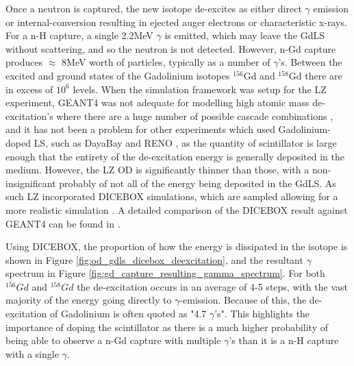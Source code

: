 \par
Once a neutron is captured, the new isotope de-excites as either direct $\gamma$ emission or internal-conversion resulting in ejected auger electrons or characteristic x-rays.
For a n-H capture, a single 2.2MeV $\gamma$ is emitted, which may leave the GdLS without scattering, and so the neutron is not detected.
However, n-Gd capture produces $\approx$ 8MeV worth of particles, typically as a number of $\gamma$'s.
Between the excited and ground states of the Gadolinium isotopes ${}^{156}$Gd and ${}^{158}$Gd there are in excess of $10^{6}$ levels.
When the simulation framework was setup for the LZ experiment, GEANT4 was not adequate for modelling high atomic mass de-excitation's where there are a huge number of possible cascade combinations \cite{ucsb_gdls_dicebox_simulations_ref}, and it has not been a problem for other experiments which used Gadolinium-doped LS, such as DayaBay \cite{dayabay_overview_ref} and RENO \cite{reno_overview_ref}, as the quantity of scintillator is large enough that the entirety of the de-excitation energy is generally deposited in the medium.
However, the LZ OD is significantly thinner than those, with a non-insignificant probably of not all of the energy being deposited in the GdLS.
As such LZ incorporated DICEBOX \cite{dicebox_simulations_ref} simulations, which are sampled allowing for a more realistic simulation \cite{lz_simulations_ref}.
A detailed comparison of the DICEBOX result against GEANT4 can be found in \cite{ucsb_gdls_dicebox_simulations_ref}.


\par
Using DICEBOX, the proportion of how the energy is dissipated in the isotope is shown in Figure \ref{fig:od_gdls_dicebox_deexcitation}, and the resultant $\gamma$ spectrum in Figure \ref{fig:gd_capture_resulting_gamma_spectrum}.
For both ${}^{156}Gd$ and ${}^{158}Gd$ the de-excitation occurs in an average of 4-5 steps, with the vast majority of the energy going directly to $\gamma$-emission.
Because of this, the de-excitation of Gadolinium is often quoted as "4.7 $\gamma$'s".
This highlights the importance of doping the scintillator as there is a much higher probability of being able to observe a n-Gd capture with multiple $\gamma$'s than it is a n-H capture with a single $\gamma$.



